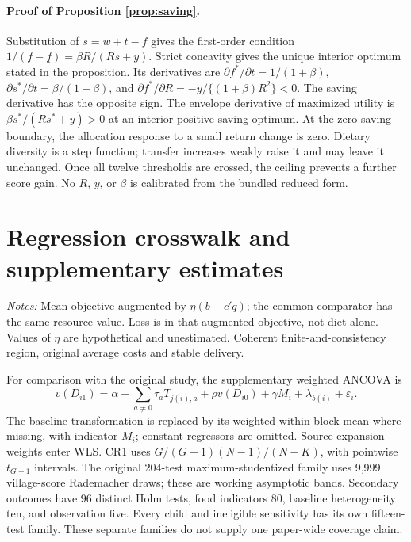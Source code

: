 \documentclass[11pt]{article}
\begin{document}
\paragraph{Proof of Proposition \ref{prop:saving}.}
Substitution of $s=w+t-f$ gives the first-order condition
$1/(f-\underline f)=\beta R/(Rs+y)$. Strict concavity gives the unique interior optimum stated in the proposition. Its derivatives are $\partial f^*/\partial t=1/(1+\beta)$, $\partial s^*/\partial t=\beta/(1+\beta)$, and $\partial f^*/\partial R=-y/\{(1+\beta)R^2\}<0$. The saving derivative has the opposite sign. The envelope derivative of maximized utility is $\beta s^*/(Rs^*+y)>0$ at an interior positive-saving optimum. At the zero-saving boundary, the allocation response to a small return change is zero. Dietary diversity is a step function; transfer increases weakly raise it and may leave it unchanged. Once all twelve thresholds are crossed, the ceiling prevents a further score gain. No $R$, $y$, or $\beta$ is calibrated from the bundled reduced form.

\clearpage
\clearpage
\section{Regression crosswalk and supplementary estimates}

\begin{table}[p]
\centering\caption{Hypothetical value of unused expected resources}\label{tab:resourcevalues}

\begin{minipage}{\textwidth}\footnotesize\emph{Notes:} Mean objective augmented by $\eta(b-c'q)$; the common comparator has the same resource value. Loss is in that augmented objective, not diet alone. Values of $\eta$ are hypothetical and unestimated. Coherent finite-and-consistency region, original average costs and stable delivery.\end{minipage}
\end{table}


For comparison with the original study, the supplementary weighted ANCOVA is
\begin{equation}
 v(D_{i1})=\alpha+\sum_{a\ne0}\tau_aT_{j(i),a}+\rho v(D_{i0})+\gamma M_i+\lambda_{b(i)}+\varepsilon_i.\label{eq:ancova}
\end{equation}
The baseline transformation is replaced by its weighted within-block mean where missing, with indicator $M_i$; constant regressors are omitted. Source expansion weights enter WLS. CR1 uses $G/(G-1)(N-1)/(N-K)$, with pointwise $t_{G-1}$ intervals. The original 204-test maximum-studentized family uses 9,999 village-score Rademacher draws; these are working asymptotic bands. Secondary outcomes have 96 distinct Holm tests, food indicators 80, baseline heterogeneity ten, and observation five. Every child and ineligible sensitivity has its own fifteen-test family. These separate families do not supply one paper-wide coverage claim.
\end{document}
